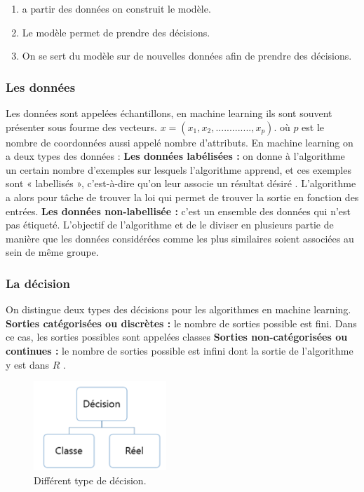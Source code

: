 \documentclass[a4paper,12pt]{article}
\begin{document}
  \begin{enumerate}
 \item a partir des données on construit le modèle.
 \item Le modèle permet de prendre des décisions.
 \item On se sert du modèle sur de nouvelles données afin de prendre des décisions.
 \end{enumerate}
\subsubsection{Les données}
Les données sont appelées échantillons, en machine learning ils sont souvent présenter sous fourme des vecteurs.\newline
$x=(x_1, x_2,.............,x_p).$\newline
où $p$ est le nombre de coordonnées aussi appelé nombre d’attributs.\newline
En machine learning on a deux types des données :\newline
\newline
\textbf{Les données labélisées :} on donne à l’algorithme un certain nombre d’exemples sur lesquels l'algorithme  apprend, et ces exemples sont « labellisés », c’est-à-dire qu’on leur associe un résultat désiré . L’algorithme a alors pour tâche de trouver la loi qui permet de trouver la sortie en fonction des entrées.\newline
\newline 
\textbf{Les données non-labellisée :} c'est un ensemble des données qui n'est pas étiqueté. L'objectif de l'algorithme et de le diviser en plusieurs partie de manière que les données considérées comme les plus similaires soient associées au sein de même groupe.
\subsubsection{La décision} 
On distingue deux types des décisions pour les algorithmes en machine learning. \newline
\textbf{Sorties catégorisées ou discrètes :} le nombre de sorties possible est fini. Dans ce cas, les sorties possibles sont appelées classes\newline
\textbf{Sorties non-catégorisées ou continues :} le nombre de sorties possible est infini dont la sortie de l'algorithme y est dans $R$ .\newline
\begin{figure}[h!]\begin{center}
    \includegraphics[width=5cm]{classifictation_vs_regression.png}
    \caption{Différent type de décision.}
    \label{fig:cvp}
  \end{center}
  \end{figure}
\end{document}
